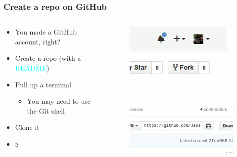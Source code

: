 \documentclass[glossy]{beamer}
\begin{document}
\begin{frame}[fragile=singleslide]
  \frametitle{Create a repo on GitHub}

  \begin{columns}[t]
    \begin{column}{6cm}
      \begin{itemize}
        \item You made a GitHub account, right?
        \item Create a repo (with a \textcolor{cyan}{README})
        \item Pull up a terminal
        \begin{itemize}
          \item You may need to use the Git shell
        \end{itemize}
        \item Clone it
        \item \$ 
      \end{itemize}
    \end{column}

    \begin{column}{6cm}
      \begin{figure}
        \centering
        \includegraphics[width=0.9\columnwidth]{new-repo}
      \end{figure}

      \begin{figure}
        \centering
        \includegraphics[width=0.9\columnwidth]{clone-url}
      \end{figure}
    \end{column}
  \end{columns}
\end{frame}
\end{document}

